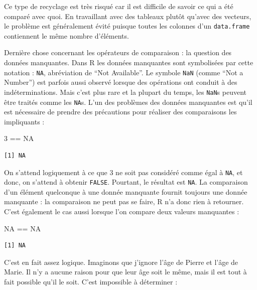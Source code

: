 \documentclass[a4paperpaper,]{article}
\newenvironment{Shaded}{\begin{snugshade}}{\end{snugshade}}
\newcommand{\DecValTok}[1]{\textcolor[rgb]{0.69,0.50,0.00}{#1}}
\newcommand{\OperatorTok}[1]{\textcolor[rgb]{0.12,0.11,0.11}{#1}}
\newcommand{\OtherTok}[1]{\textcolor[rgb]{0.00,0.43,0.16}{#1}}
\newcommand{\StringTok}[1]{\textcolor[rgb]{0.75,0.01,0.01}{#1}}
\begin{document}
Ce type de recyclage est très risqué car il est difficile de savoir ce qui a été comparé avec quoi. En travaillant avec des tableaux plutôt qu'avec des vecteurs, le problème est généralement évité puisque toutes les colonnes d'un \texttt{data.frame} contiennent le même nombre d'éléments.

Dernière chose concernant les opérateurs de comparaison : la question des données manquantes. Dans R les données manquantes sont symbolisées par cette notation : \texttt{NA}, abréviation de ``Not Available''. Le symbole \texttt{NaN} (comme ``Not a Number'') est parfois aussi observé lorsque des opérations ont conduit à des indéterminations. Mais c'est plus rare et la plupart du temps, les \texttt{NaN}s peuvent être traités comme les \texttt{NA}s. L'un des problèmes des données manquantes est qu'il est nécessaire de prendre des précautions pour réaliser des comparaisons les impliquants :

\begin{Shaded}
\begin{Highlighting}[]
\DecValTok{3} \OperatorTok{==}\StringTok{ }\OtherTok{NA}
\end{Highlighting}
\end{Shaded}

\begin{verbatim}
[1] NA
\end{verbatim}

On s'attend logiquement à ce que 3 ne soit pas considéré comme égal à \texttt{NA}, et donc, on s'attend à obtenir \texttt{FALSE}. Pourtant, le résultat est \texttt{NA}. La comparaison d'un élément quelconque à une donnée manquante fournit toujours une donnée manquante : la comparaison ne peut pas se faire, R n'a donc rien à retourner. C'est également le cas aussi lorsque l'on compare deux valeurs manquantes :

\begin{Shaded}
\begin{Highlighting}[]
\OtherTok{NA} \OperatorTok{==}\StringTok{ }\OtherTok{NA}
\end{Highlighting}
\end{Shaded}

\begin{verbatim}
[1] NA
\end{verbatim}

C'est en fait assez logique. Imaginons que j'ignore l'âge de Pierre et l'âge de Marie. Il n'y a aucune raison pour que leur âge soit le même, mais il est tout à fait possible qu'il le soit. C'est impossible à déterminer :
\end{document}
